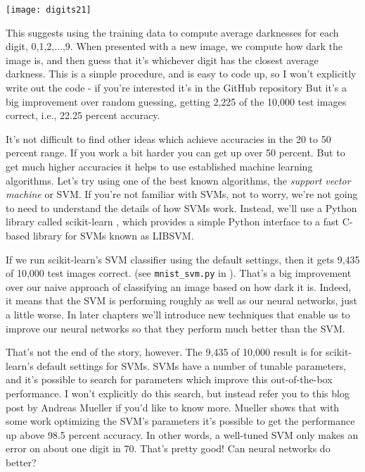\begin{marginfigure}
\texttt{[image: digits21]}
\end{marginfigure}

This suggests using the training data to compute average darknesses for each digit, 0,1,2,$\ldots$,9. When presented with a new image, we compute how dark the image is, and then guess that it's whichever digit has the closest average darkness. This is a simple procedure, and is easy to code up, so I won't explicitly write out the code - if you're interested it's in the GitHub repository \cite{Nielsengithub2019} But it's a big improvement over random guessing, getting 2,225 of the 10,000 test images correct, i.e., 22.25 percent accuracy.

It's not difficult to find other ideas which achieve accuracies in the 20 to 50 percent range. If you work a bit harder you can get up over 50 percent. But to get much higher accuracies it helps to use established machine learning algorithms. Let's try using one of the best known algorithms, the \textit{support vector machine} or SVM. If you're not familiar with SVMs, not to worry, we're not going to need to understand the details of how SVMs work. Instead, we'll use a Python library called scikit-learn \cite{scikit-learn,scikit-learnwebsite}, which provides a simple Python interface to a fast C-based library for SVMs known as LIBSVM\cite{libsvm}.

If we run scikit-learn's SVM classifier using the default settings, then it gets 9,435 of 10,000 test images correct. (see \lstinline{mnist_svm.py} in  \cite{Nielsengithub2019}). That's a big improvement over our naive approach of classifying an image based on how dark it is. Indeed, it means that the SVM is performing roughly as well as our neural networks, just a little worse. In later chapters we'll introduce new techniques that enable us to improve our neural networks so that they perform much better than the SVM.

That's not the end of the story, however. The 9,435 of 10,000 result is for scikit-learn's default settings for SVMs. SVMs have a number of tunable parameters, and it's possible to search for parameters which improve this out-of-the-box performance. I won't explicitly do this search, but instead refer you to this blog post \cite{Muellermnist2019} by Andreas Mueller if you'd like to know more. Mueller shows that with some work optimizing the SVM's parameters it's possible to get the performance up above 98.5 percent accuracy. In other words, a well-tuned SVM only makes an error on about one digit in 70. That's pretty good! Can neural networks do better?


